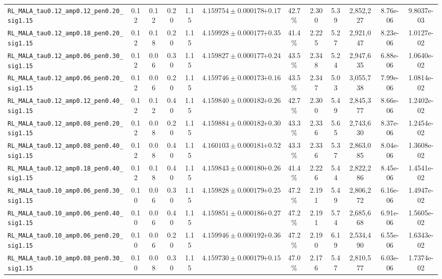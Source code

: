 \documentclass[10pt,a4paper]{article}
\begin{document}
\begin{table}[H]
\begin{adjustbox}{max width=\textwidth}
\begin{tabular}{lcccccccccccc}
\texttt{RL\_MALA\_tau0.12\_amp0.12\_pen0.20\_sig1.15} & 0.12 & 0.12 & 0.20 & 1.15 & $4.159754 \pm 0.000178$ & $+0.17$ & 42.7\% & 2.300 & 5.39 & 2,852,227 & 8.76e-06 & 9.8037e-03 \\
\texttt{RL\_MALA\_tau0.12\_amp0.18\_pen0.20\_sig1.15} & 0.12 & 0.18 & 0.20 & 1.15 & $4.159928 \pm 0.000177$ & $+0.35$ & 41.4\% & 2.225 & 5.27 & 2,921,047 & 8.23e-06 & 1.0127e-02 \\
\texttt{RL\_MALA\_tau0.12\_amp0.06\_pen0.30\_sig1.15} & 0.12 & 0.06 & 0.30 & 1.15 & $4.159827 \pm 0.000177$ & $+0.24$ & 43.5\% & 2.348 & 5.24 & 2,947,635 & 6.88e-06 & 1.0640e-02 \\
\texttt{RL\_MALA\_tau0.12\_amp0.06\_pen0.20\_sig1.15} & 0.12 & 0.06 & 0.20 & 1.15 & $4.159746 \pm 0.000173$ & $+0.16$ & 43.5\% & 2.347 & 5.03 & 3,055,738 & 7.99e-06 & 1.0814e-02 \\
\texttt{RL\_MALA\_tau0.12\_amp0.12\_pen0.40\_sig1.15} & 0.12 & 0.12 & 0.40 & 1.15 & $4.159840 \pm 0.000182$ & $+0.26$ & 42.7\% & 2.300 & 5.49 & 2,845,377 & 8.66e-06 & 1.2402e-02 \\
\texttt{RL\_MALA\_tau0.12\_amp0.08\_pen0.20\_sig1.15} & 0.12 & 0.08 & 0.20 & 1.15 & $4.159884 \pm 0.000182$ & $+0.30$ & 43.3\% & 2.336 & 5.65 & 2,743,630 & 8.37e-06 & 1.2454e-02 \\
\texttt{RL\_MALA\_tau0.12\_amp0.08\_pen0.40\_sig1.15} & 0.12 & 0.08 & 0.40 & 1.15 & $4.160103 \pm 0.000181$ & $+0.52$ & 43.3\% & 2.336 & 5.37 & 2,863,085 & 8.04e-06 & 1.3608e-02 \\
\texttt{RL\_MALA\_tau0.12\_amp0.18\_pen0.40\_sig1.15} & 0.12 & 0.18 & 0.40 & 1.15 & $4.159843 \pm 0.000180$ & $+0.26$ & 41.4\% & 2.226 & 5.44 & 2,822,286 & 8.45e-06 & 1.4541e-02 \\
\texttt{RL\_MALA\_tau0.10\_amp0.06\_pen0.30\_sig1.15} & 0.10 & 0.06 & 0.30 & 1.15 & $4.159828 \pm 0.000179$ & $+0.25$ & 47.2\% & 2.191 & 5.49 & 2,806,272 & 6.16e-06 & 1.4947e-02 \\
\texttt{RL\_MALA\_tau0.10\_amp0.06\_pen0.40\_sig1.15} & 0.10 & 0.06 & 0.40 & 1.15 & $4.159851 \pm 0.000186$ & $+0.27$ & 47.2\% & 2.191 & 5.74 & 2,685,668 & 6.91e-06 & 1.5605e-02 \\
\texttt{RL\_MALA\_tau0.10\_amp0.06\_pen0.20\_sig1.15} & 0.10 & 0.06 & 0.20 & 1.15 & $4.159946 \pm 0.000192$ & $+0.36$ & 47.2\% & 2.190 & 6.19 & 2,534,490 & 6.55e-06 & 1.6343e-02 \\
\texttt{RL\_MALA\_tau0.10\_amp0.08\_pen0.30\_sig1.15} & 0.10 & 0.08 & 0.30 & 1.15 & $4.159730 \pm 0.000179$ & $+0.15$ & 47.0\% & 2.176 & 5.47 & 2,810,577 & 6.03e-06 & 1.7374e-02 \\

\end{tabular}
\end{adjustbox}
\end{table}
\end{document}
